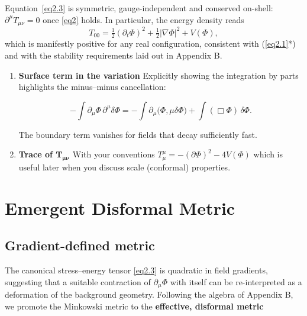 \documentclass{iopjournal}
\begin{document}
Equation~\eqref{eq2.3} is symmetric, gauge-independent and conserved on-shell: $\partial^{\mu}T_{\mu\nu}=0$ once \eqref{eq2} holds. In particular, the energy density reads
\begin{equation}\label{eq2.4}
  T_{00} =\tfrac12(\partial_{t}\Phi)^{2} +\tfrac12|\nabla\Phi|^{2} +V(\Phi),
\end{equation}
which is manifestly positive for any real configuration, consistent with (\ref{eq2.1}*) and with the stability requirements laid out in Appendix B.


\begin{enumerate}
\item  \textbf{Surface term in the variation} Explicitly showing the integration by parts highlights the minus--minus cancellation:

$$-\!\int\!\partial_\mu\Phi\,\partial^\mu\delta\Phi = -\!\int\!\partial_\mu\!\bigl(\Phi{,\mu}\delta\Phi\bigr) +\!\int\!(\Box\Phi)\,\delta\Phi.$$


The boundary term vanishes for fields that decay sufficiently fast.
\item  \textbf{Trace of $\boldsymbol{T_{\mu\nu}}$} With your conventions $T^\mu_\mu = -(\partial\Phi)^2 - 4V(\Phi)$ which is useful later when you discuss scale (conformal) properties.
\end{enumerate}


\section{Emergent Disformal Metric}

\subsection{Gradient-defined metric}

The canonical stress--energy tensor \eqref{eq2.3} is quadratic in field gradients, suggesting that a suitable contraction of $\partial_\mu\Phi$ with itself can be re-interpreted as a deformation of the background geometry. Following the algebra of Appendix B, we promote the Minkowski metric to the \textbf{effective, disformal metric}
\end{document}
